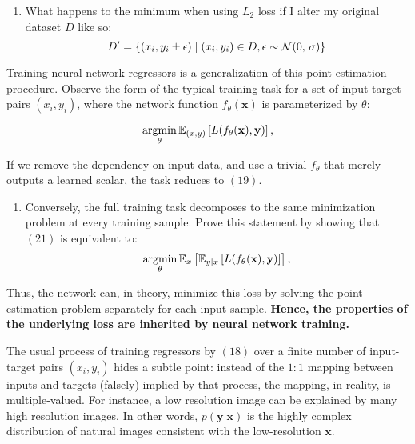 \begin{enumerate}[resume]
\item What happens to the minimum when using $L_2$ loss if I alter my original dataset $D$ like so:
\begin{equation}
D' = \left\{(x_i, y_i \pm\epsilon) \mid (x_i,y_i) \in D, \epsilon \sim \mathcal{N}(0,\,\sigma)\right\}
\end{equation}
\end{enumerate}

Training neural network regressors is a generalization of
this point estimation procedure. Observe the form of the
typical training task for a set of input-target pairs $(x_i
, y_i)$, where the network function $f_\theta(\mathbf{x})$ is parameterized by $\theta$:

\begin{equation}
\mathop{\mathrm{argmin}}_{\theta} \mathbb{E}_{(x,y)} \left[L(f_{\theta}(\mathbf{x}), \mathbf{y})\right],
\end{equation}

If we remove the dependency on input data, and
use a trivial $f_\theta$ that merely outputs a learned scalar, the task reduces to $(19)$. 

\begin{enumerate}[resume]
\item Conversely, the full training task decomposes to the same minimization problem at every training sample. Prove this statement by showing that $(21)$ is equivalent to: 
\begin{equation}
\mathop{\mathrm{argmin}}_{\theta} \mathbb{E}_{x} \left[ \mathbb{E}_{y|x} \left[L(f_{\theta}(\mathbf{x}), \mathbf{y})\right]\right],
\end{equation}
\end{enumerate}

Thus, the network can, in theory, minimize this loss by solving the
point estimation problem separately for each input sample.
\textbf {Hence, the properties of the underlying loss are inherited by neural network training.}

The usual process of training regressors by $(18)$ over
a finite number of input-target pairs $(x_i, y_i)$ hides a subtle
point: instead of the $1:1$ mapping between inputs and targets (falsely) implied by that process, the mapping, in reality,
is multiple-valued. For instance, a low resolution image can be explained by many high resolution images. In
other words, $p(\mathbf{y}|\mathbf{x})$ is the highly complex distribution of
natural images consistent with the low-resolution $\mathbf{x}$. 

